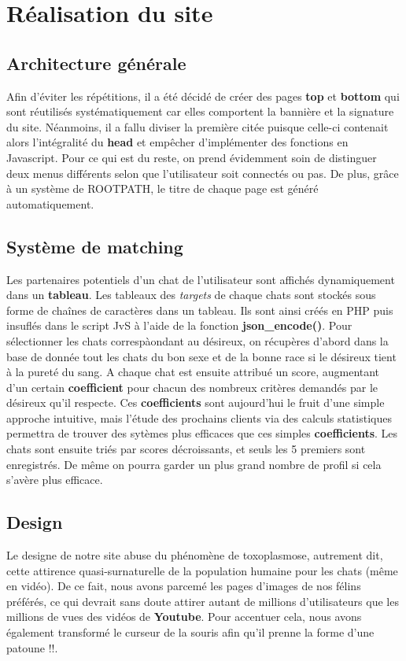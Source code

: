 \documentclass{article}
\begin{document}
\newpage
\section{Réalisation du site}

\subsection{Architecture générale}
Afin d'éviter les répétitions, il a été décidé de créer des pages \textbf{top} et \textbf{bottom} qui sont réutilisés systématiquement car elles comportent la bannière et la signature du site. Néanmoins, il a fallu diviser la première citée puisque celle-ci contenait alors l'intégralité du \textbf{head} et empêcher d'implémenter des fonctions en Javascript.
\newline
\newline
Pour ce qui est du reste, on prend évidemment soin de distinguer deux menus différents selon que l'utilisateur soit connectés ou pas. De plus, grâce à un système de ROOTPATH, le titre de chaque page est généré automatiquement.

\subsection{Système de matching}
Les partenaires potentiels d'un chat de l'utilisateur sont affichés dynamiquement dans un \textbf{tableau}. Les tableaux des \textit{targets} de chaque chats sont stockés sous forme de chaînes de caractères dans un tableau. Ils sont ainsi créés en PHP puis insuflés dans le script JvS à l'aide de la fonction \textbf{json\_encode()}.
\newline
Pour sélectionner les chats correspàondant au désireux, on récupères d'abord dans la base de donnée tout les chats du bon sexe et de la bonne race si le désireux tient à la pureté du sang. A chaque chat est ensuite attribué un score, augmentant d'un certain \textbf{coefficient} pour chacun des nombreux critères demandés par le désireux qu'il respecte. Ces \textbf{coefficients} sont aujourd'hui le fruit d'une simple approche intuitive, mais l'étude des prochains clients via des calculs statistiques permettra de trouver des sytèmes plus efficaces que ces simples \textbf{coefficients}. Les chats sont ensuite triés par scores décroissants, et seuls les 5 premiers sont enregistrés. De même on pourra garder un plus grand nombre de profil si cela s'avère plus efficace. 

\subsection{Design}
Le designe de notre site abuse du phénomène de toxoplasmose, autrement dit, cette attirence quasi-surnaturelle de la population humaine pour les chats (même en vidéo). De ce fait, nous avons parcemé les pages d'images de nos félins préférés, ce qui devrait sans doute attirer autant de millions d'utilisateurs que les millions de vues des vidéos de \textbf{Youtube}.
\newline
\newline
Pour accentuer cela, nous avons également transformé le curseur de la souris afin qu'il prenne la forme d'une patoune !!.
\newpage
\end{document}
